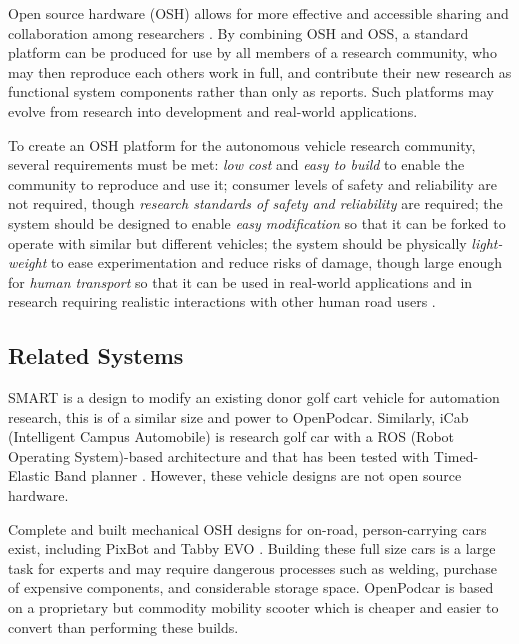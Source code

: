 \documentclass[a4paper]{article}
\begin{document}
	Open source hardware (OSH) allows for more effective and accessible sharing and collaboration among researchers \cite{fisher2012open}. By combining OSH and OSS, a standard platform can be produced for use by all members of a research community, who may then reproduce each others work in full, and contribute their new research as functional system components rather than only as reports. Such platforms may evolve from research into development and real-world applications.
	
	To create an OSH platform for the autonomous vehicle research community, several requirements must be met: {\em low cost} and {\em easy to build} to enable the community to reproduce and use it; consumer levels of safety and reliability are not required, though {\em research standards of safety and reliability} are required; the system should be designed to enable {\em easy modification} so that it can be forked to operate with similar but different vehicles; the system should be physically {\em light-weight} to ease experimentation and reduce risks of damage, though large enough for {\em human transport} so that it can be used in real-world applications and in research requiring realistic interactions with other human road users \cite{camara2021evaluating, delucia2013effects}.
	
	\subsection{Related Systems}
	\label{related_systems}
	
	SMART \cite{pendleton2015autonomous} is a design to modify an existing donor golf cart vehicle for automation research, this is of a similar size and power to OpenPodcar. Similarly, iCab (Intelligent Campus Automobile) \cite{gomez2016ros} is research golf car with a ROS (Robot Operating System)-based architecture and that has been tested with Timed-Elastic Band planner \cite{marin-plaza2018global}. However, these vehicle designs are not open source hardware.
	
	Complete and built mechanical OSH designs for on-road, person-carrying cars exist, including PixBot \cite{pixmovingpixbot} and Tabby EVO \cite{openmotorstabby}. Building these full size cars is a large task for experts and may require dangerous processes such as welding, purchase of expensive components, and considerable storage space. OpenPodcar is based on a proprietary but commodity mobility scooter which is cheaper and easier to convert than performing these builds. 
	
\end{document}
